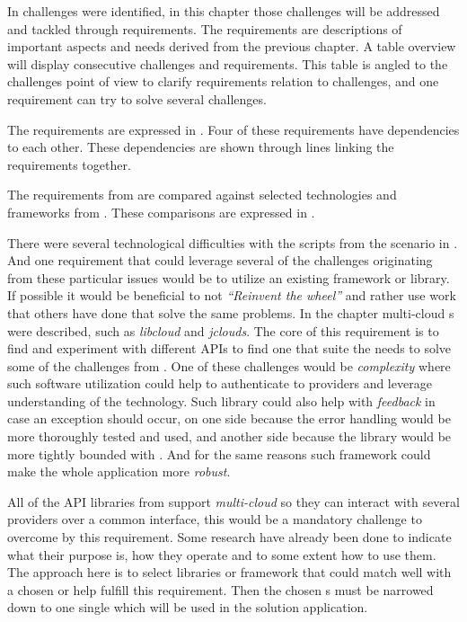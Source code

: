 
In  challenges were identified, in this chapter those challenges
will be addressed and tackled through requirements.
The requirements are descriptions of important aspects and needs derived from the previous chapter.
A table overview will display consecutive challenges and requirements. 
This table is angled to the challenges point of view to clarify requirements relation to challenges,
and one requirement can try to solve several challenges.


The requirements are expressed in .
Four of these requirements have dependencies to each other.
These dependencies are shown through lines linking the requirements
together.

The requirements from  are compared against selected
technologies and frameworks from .
These comparisons are expressed in .



There were several technological difficulties with the scripts from the scenario in 
.
And one requirement that could leverage several of the challenges
originating from these particular issues would be to utilize an existing framework or library.
If possible it would be beneficial to not \emph{``Reinvent the wheel''} and rather use work
that others have done that solve the same problems.
In the chapter  multi-cloud s 
were described, such as \emph{libcloud} and \emph{jclouds}.
The core of this requirement is to find and experiment with different APIs to find one
that suite the needs to solve some of the challenges from .
One of these challenges would be \emph{complexity} where such software utilization
could help to authenticate to providers and leverage understanding of the technology.
Such library could also help with \emph{feedback} in case an exception should occur, on one
side because the error handling would be more thoroughly tested and used,
and another side because the library would be more tightly bounded with .
And for the same reasons such framework could make the whole application more \emph{robust}.

All of the API libraries from  support \emph{multi-cloud} so they can
interact with several providers over a common interface, this would be a mandatory challenge
to overcome by this requirement.
Some research have already been done to indicate what their purpose is, 
how they operate and to some extent how to use them.
The approach here is to select libraries or framework that could match well with a chosen
 or help fulfill this requirement.
Then the chosen s must be narrowed down to one single  which will be
used in the solution application.

